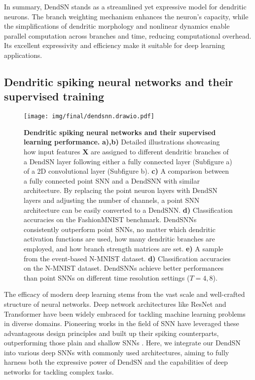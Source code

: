 In summary, DendSN stands as a streamlined yet expressive model for dendritic neurons. The branch weighting mechanism enhances the neuron's capacity, while the simplifications of dendritic morphology and nonlinear dynamics enable parallel computation across branches and time, reducing computational overhead. Its excellent expressivity and efficiency make it suitable for deep learning applications.

\subsection*{Dendritic spiking neural networks and their supervised training}
\label{subsec:results-dendsnn}

\begin{figure}[tp!]
    \centering
    \texttt{[image: img/final/dendsnn.drawio.pdf]}
    \caption{
        \textbf{Dendritic spiking neural networks and their supervised learning performance.}
        \textbf{a),b)} Detailed illustrations showcasing how input features $\mathbf{X}$ are assigned to different dendritic branches of a DendSN layer following either a fully connected layer (Subfigure a) of a 2D convolutional layer (Subfigure b).
        \textbf{c)} A comparison between a fully connected point SNN and a DendSNN with similar architecture. By replacing the point neuron layers with DendSN layers and adjusting the number of channels, a point SNN architecture can be easily converted to a DendSNN.
        \textbf{d)} Classification accuracies on the FashionMNIST benchmark. DendSNNs consistently outperform point SNNs, no matter which dendritic activation functions are used, how many dendritic branches are employed, and how branch strength matrices are set.
        \textbf{e)} A sample from the event-based N-MNIST dataset. 
        \textbf{d)} Classification accuracies on the N-MNIST dataset. DendSNNs achieve better performances than point SNNs on different time resolution settings ($T=4,8$).
    }
    \label{fig:dendsnn}
\end{figure}

The efficacy of modern deep learning stems from the vast scale and well-crafted structure of neural networks. Deep network architectures like ResNet \cite{he2016resnet} and Transformer \cite{vaswani2017transformer} have been widely embraced for tackling machine learning problems in diverse domains. Pioneering works in the field of SNN have leveraged these advantageous design principles and built up their spiking counterparts, outperforming those plain and shallow SNNs \cite{zheng2020going,fang2021sew,hu2023advancing,zhou2023spikformer,zhou2023spikingformer,yao2023spikedriventransformer,yao2024spikedriventransformer}. Here, we integrate our DendSN into various deep SNNs with commonly used architectures, aiming to fully harness both the expressive power of DendSN and the capabilities of deep networks for tackling complex tasks.

